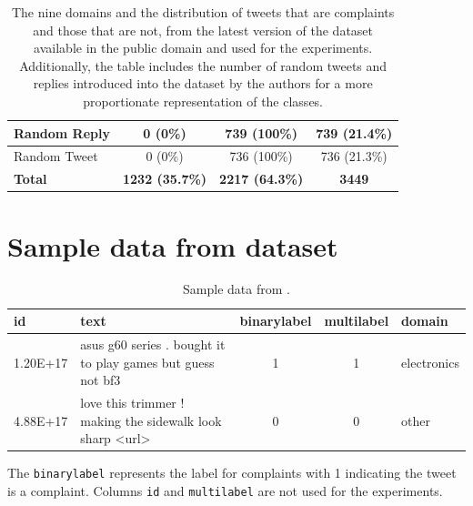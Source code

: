 \begin{table}[ht]
\begin{tabularx}{\textwidth}{|X|c|c|c|}
        \hline
        \hline
        Random Reply                & 0 \small{(0\%)}                & 739 \small{(100\%)}            & 739 \small{(21.4\%)}  \\
        \hline
        Random Tweet                & 0 \small{(0\%)}                & 736 \small{(100\%)}            & 736 \small{(21.3\%)}  \\
        \hline
        \hline
        \rowcolor[gray]{0.9}
        \textbf{Total}              & \textbf{1232 \small{(35.7\%)}} & \textbf{2217 \small{(64.3\%)}} & \textbf{3449}         \\
        \hline
    \end{tabularx}
    \caption{The nine domains and the distribution of tweets that are complaints and those that are not, from the latest version of the dataset available in the public domain and used for the experiments. Additionally, the table includes the number of random tweets and replies introduced into the dataset by the authors for a more proportionate representation of the classes.}
    \label{tab: fulldataset_breakdown}
\end{table}

\section{Sample data from dataset}
\begin{table}[ht]
    \captionsetup{font=small}
    \small
    \centering
    \begin{tabularx}{\textwidth}{|l|X|c|c|l|}
        \hline
        \rowcolor[gray]{0.7}
        \textbf{id} & \textbf{text}                                               & \textbf{binarylabel} & \textbf{multilabel} & \textbf{domain} \\
        \hline
        1.20E+17    & asus g60 series . bought it to play games but guess not bf3 & 1                    & 1                   & electronics     \\
        \hline
        4.88E+17    & love this trimmer ! making the sidewalk look sharp <url>    & 0                    & 0                   & other           \\
        \hline
    \end{tabularx}
    \caption{Sample data from \cite{jinModelingSeverityComplaints2021}.}
    \label{tab: apdx_sample_data}
\end{table}

The \texttt{binarylabel} represents the label for complaints with 1 indicating the tweet is a complaint. Columns \texttt{id} and \texttt{multilabel} are not used for the experiments.



